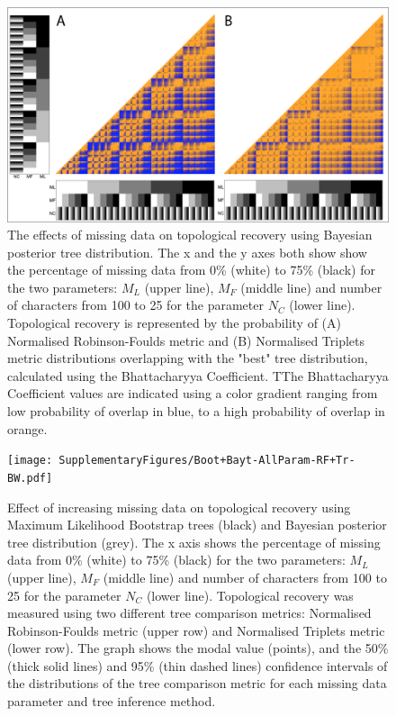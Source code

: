 \documentclass[12pt,letterpaper]{article}
\begin{document}
\begin{figure} 
\centering
    \includegraphics[width=1\textwidth]{SupplementaryFigures/PairwiseComp-Bayt-RF+Tr-colour.png} %
    \caption{The effects of missing data on topological recovery using Bayesian posterior tree distribution. The x and the y axes both show show the percentage of missing data from 0\% (white) to 75\% (black) for the two parameters: $M_{L}$ (upper line), $M_{F}$ (middle line) and number of characters from 100 to 25 for the parameter $N_{C}$ (lower line). Topological recovery is represented by the probability of (A) Normalised Robinson-Foulds metric and (B) Normalised Triplets metric distributions overlapping with the "best" tree distribution, calculated using the Bhattacharyya Coefficient. TThe Bhattacharyya Coefficient values are indicated using a color gradient ranging from low probability of overlap in blue, to a high probability of overlap in orange.}
\label{Fig_Supp_paircomp_Bayt}
\end{figure} 


\begin{figure} 
\centering
    \texttt{[image: SupplementaryFigures/Boot+Bayt-AllParam-RF+Tr-BW.pdf]}
    \caption{Effect of increasing missing data on topological recovery using Maximum Likelihood Bootstrap trees (black) and Bayesian posterior tree distribution (grey). The x axis shows the percentage of missing data from 0\% (white) to 75\% (black) for the two parameters: $M_{L}$ (upper line), $M_{F}$ (middle line) and number of characters from 100 to 25 for the parameter $N_{C}$ (lower line). Topological recovery was measured using two different tree comparison metrics: Normalised Robinson-Foulds metric (upper row) and Normalised Triplets metric (lower row). The graph shows the modal value (points), and the 50\% (thick solid lines) and 95\% (thin dashed lines) confidence intervals of the distributions of the tree comparison metric for each missing data parameter and tree inference method.} 
\label{Fig_Supp_BootBayt_allparam} 
\end{figure}
\end{document}
